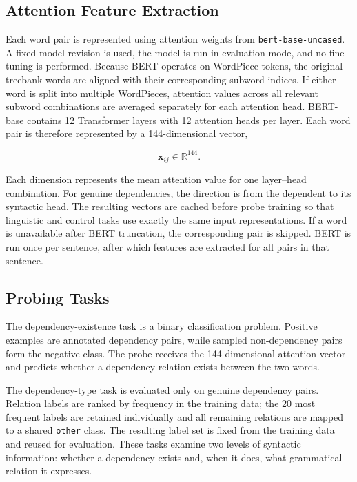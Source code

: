 \documentclass[12pt,a4paper]{article}
\begin{document}
\subsection{Attention Feature Extraction}

Each word pair is represented using attention weights from \texttt{bert-base-uncased}. A fixed model revision is used, the model is run in evaluation mode, and no fine-tuning is performed. Because BERT operates on WordPiece tokens, the original treebank words are aligned with their corresponding subword indices. If either word is split into multiple WordPieces, attention values across all relevant subword combinations are averaged separately for each attention head.
BERT-base contains 12 Transformer layers with 12 attention heads per layer. Each word pair is therefore represented by a 144-dimensional vector,

\begin{equation}
\mathbf{x}_{ij} \in \mathbb{R}^{144}.
\end{equation}

Each dimension represents the mean attention value for one layer--head combination. For genuine dependencies, the direction is from the dependent to its syntactic head. The resulting vectors are cached before probe training so that linguistic and control tasks use exactly the same input representations. If a word is unavailable after BERT truncation, the corresponding pair is skipped. BERT is run once per sentence, after which features are extracted for all pairs in that sentence.

\subsection{Probing Tasks}

The dependency-existence task is a binary classification problem. Positive examples are annotated dependency pairs, while sampled non-dependency pairs form the negative class. The probe receives the 144-dimensional attention vector and predicts whether a dependency relation exists between the two words.

The dependency-type task is evaluated only on genuine dependency pairs. Relation labels are ranked by frequency in the training data; the 20 most frequent labels are retained individually and all remaining relations are mapped to a shared \texttt{other} class. The resulting label set is fixed from the training data and reused for evaluation. These tasks examine two levels of syntactic information: whether a dependency exists and, when it does, what grammatical relation it expresses.
\end{document}
